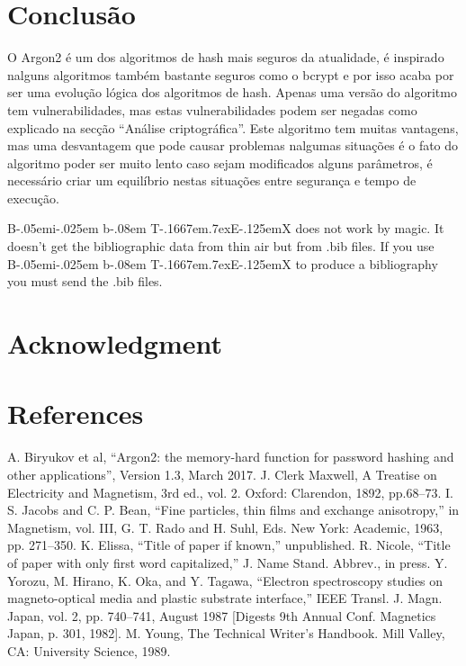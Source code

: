 \documentclass[conference]{IEEEtran}
\def\BibTeX{{\rm B\kern-.05em{\sc i\kern-.025em b}\kern-.08em
    T\kern-.1667em\lower.7ex\hbox{E}\kern-.125emX}}
\begin{document}
\section{Conclusão}

O Argon2 é um dos algoritmos de hash mais seguros da atualidade, é inspirado nalguns algoritmos também bastante seguros 
como o bcrypt e por isso acaba por ser uma evolução lógica dos algoritmos de hash.
Apenas uma versão do algoritmo tem vulnerabilidades, mas estas vulnerabilidades podem ser negadas como explicado na 
secção “Análise criptográfica”. Este algoritmo tem muitas vantagens, mas uma desvantagem que pode causar 
problemas nalgumas situações é o fato do algoritmo poder ser muito lento caso sejam modificados alguns parâmetros, 
é necessário criar um equilíbrio nestas situações entre segurança e tempo de execução.

{\BibTeX} does not work by magic. It doesn't get the bibliographic
data from thin air but from .bib files. If you use {\BibTeX} to produce a
bibliography you must send the .bib files. 

\section*{Acknowledgment}



\section*{References}

\begin{thebibliography}{00}
 A. Biryukov et al, “Argon2: the memory-hard function for password hashing and other applications”, Version 1.3, March 2017.
 J. Clerk Maxwell, A Treatise on Electricity and Magnetism, 3rd ed., vol. 2. Oxford: Clarendon, 1892, pp.68--73.
 I. S. Jacobs and C. P. Bean, ``Fine particles, thin films and exchange anisotropy,'' in Magnetism, vol. III, G. T. Rado and H. Suhl, Eds. New York: Academic, 1963, pp. 271--350.
 K. Elissa, ``Title of paper if known,'' unpublished.
 R. Nicole, ``Title of paper with only first word capitalized,'' J. Name Stand. Abbrev., in press.
 Y. Yorozu, M. Hirano, K. Oka, and Y. Tagawa, ``Electron spectroscopy studies on magneto-optical media and plastic substrate interface,'' IEEE Transl. J. Magn. Japan, vol. 2, pp. 740--741, August 1987 [Digests 9th Annual Conf. Magnetics Japan, p. 301, 1982].
 M. Young, The Technical Writer's Handbook. Mill Valley, CA: University Science, 1989.
\end{thebibliography}
\end{document}
